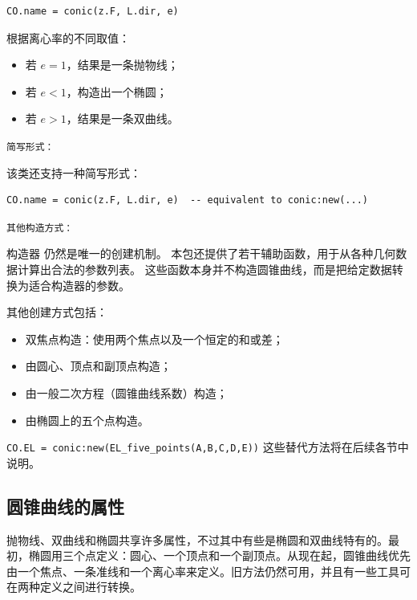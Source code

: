 \begin{mybox}
\begin{verbatim}
CO.name = conic(z.F, L.dir, e)
\end{verbatim}
\end{mybox}

根据离心率的不同取值：
\begin{itemize}
  \item 若 \(e = 1\)，结果是一条抛物线；
  \item 若 \(e < 1\)，构造出一个椭圆；
  \item 若 \(e > 1\)，结果是一条双曲线。
\end{itemize}

\vspace{1em}
\texttt{简写形式：}

该类还支持一种简写形式：
\begin{mybox}
\begin{verbatim}
CO.name = conic(z.F, L.dir, e)  -- equivalent to conic:new(...)
\end{verbatim}
\end{mybox}

\texttt{其他构造方式：}

构造器  仍然是唯一的创建机制。
本包还提供了若干辅助函数，用于从各种几何数据计算出合法的参数列表。
这些函数本身并不构造圆锥曲线，而是把给定数据转换为适合构造器的参数。

其他创建方式包括：
\begin{itemize}
  \item 双焦点构造：使用两个焦点以及一个恒定的和或差；
  \item 由圆心、顶点和副顶点构造；
  \item 由一般二次方程（圆锥曲线系数）构造；
  \item 由椭圆上的五个点构造。
\end{itemize}


\verb|CO.EL = conic:new(EL_five_points(A,B,C,D,E))|
这些替代方法将在后续各节中说明。



\subsection{圆锥曲线的属性}

抛物线、双曲线和椭圆共享许多属性，不过其中有些是椭圆和双曲线特有的。最初，椭圆用三个点定义：圆心、一个顶点和一个副顶点。从现在起，圆锥曲线优先由一个焦点、一条准线和一个离心率来定义。旧方法仍然可用，并且有一些工具可在两种定义之间进行转换。

